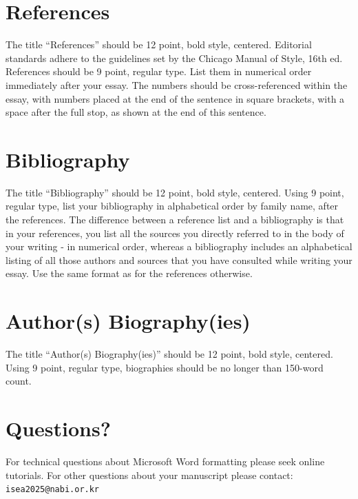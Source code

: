 \documentclass[letterpaper]{article}
\begin{document}
\section{References}
The title “References” should be 12 point, bold style, centered. Editorial standards adhere to the guidelines set by the Chicago Manual of Style, 16th ed. References should be 9 point, regular type. List them in numerical order immediately after your essay. The numbers should be cross-referenced within the essay, with numbers placed at the end of the sentence in square brackets, with a space after the full stop, as shown at the end of this sentence. \cite{boden92}




\section{Bibliography}
The title “Bibliography” should be 12 point, bold style, centered. Using 9 point, regular type, list your bibliography in alphabetical order by family name, after the references. The difference between a reference list and a bibliography is that in your references, you list all the sources you directly referred to in the body of your writing - in numerical order, whereas a bibliography includes an alphabetical listing of all those authors and sources that you have consulted while writing your essay. Use the same format as for the references otherwise.

\section{Author(s) Biography(ies)}
The title ``Author(s) Biography(ies)'' should be 12 point, bold style, centered. Using 9 point, regular type, biographies should be no longer than 150-word count.

\section{Questions?}

For technical questions about Microsoft Word formatting please seek online tutorials. For other questions about your manuscript please contact: {\tt isea2025@nabi.or.kr}
\end{document}
